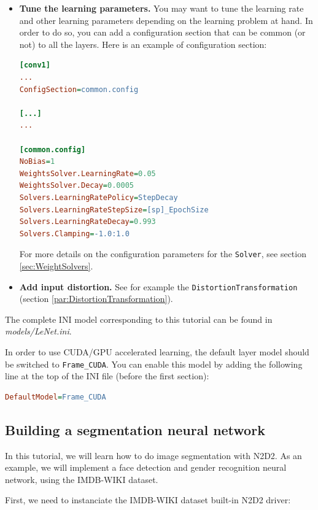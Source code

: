 \documentclass[a4paper,11pt,oneside]{article}
\newenvironment{myitemize}
{ \begin{itemize}
    \setlength{\itemsep}{0pt}
    \setlength{\parskip}{0pt}
    \setlength{\parsep}{0pt}     }
{ \end{itemize}                  }
\begin{document}
\begin{myitemize}
\begin{lstlisting}[language=ini]
[fc2]
Input=fc1.drop ; Replaces "Input=fc1"
...
\end{lstlisting}

\item \textbf{Tune the learning parameters.}
You may want to tune the learning rate and other learning parameters depending
on the learning problem at hand. In order to do so, you can add a configuration
section that can be common (or not) to all the layers. Here is an example of
configuration section:

\begin{lstlisting}[language=ini]
[conv1]
...
ConfigSection=common.config

[...]
...

[common.config]
NoBias=1
WeightsSolver.LearningRate=0.05
WeightsSolver.Decay=0.0005
Solvers.LearningRatePolicy=StepDecay
Solvers.LearningRateStepSize=[sp]_EpochSize
Solvers.LearningRateDecay=0.993
Solvers.Clamping=-1.0:1.0
\end{lstlisting}

For more details on the configuration parameters for the \lstinline!Solver!, see
section \ref{sec:WeightSolvers}.

\item \textbf{Add input distortion.} See for example the
\lstinline!DistortionTransformation! (section
\ref{par:DistortionTransformation}).
\end{myitemize}

The complete INI model corresponding to this tutorial can be found in
\emph{models/LeNet.ini}.

In order to use CUDA/GPU accelerated learning, the default layer model should be
switched to \lstinline!Frame_CUDA!. You can enable this model by adding the
following line at the top of the INI file (before the first section):
\begin{lstlisting}[language=ini]
DefaultModel=Frame_CUDA
\end{lstlisting}

\subsection{Building a segmentation neural network}

In this tutorial, we will learn how to do image segmentation with N2D2. As an
example, we will implement a face detection and gender recognition neural
network, using the IMDB-WIKI dataset.

First, we need to instanciate the IMDB-WIKI dataset built-in N2D2 driver:
\end{document}
